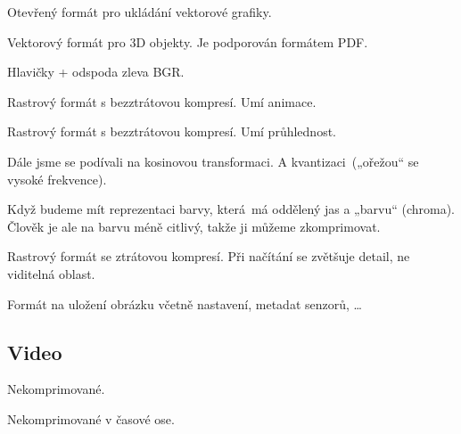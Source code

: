 \documentclass[12pt]{article}					%
\begin{document}
\begin{definice}[SVG]
	Otevřený formát pro ukládání vektorové grafiky.
\end{definice}

\begin{definice}[Universal 3D (U3D)]
	Vektorový formát pro 3D objekty. Je podporován formátem PDF.
\end{definice}

\begin{definice}
	Hlavičky + odspoda zleva BGR.
\end{definice}

\begin{definice}[GIF]
	Rastrový formát s bezztrátovou kompresí. Umí animace.
\end{definice}

\begin{definice}[PNG]
	Rastrový formát s bezztrátovou kompresí. Umí průhlednost.
\end{definice}

\begin{poznamka}
	Dále jsme se podívali na kosinovou transformaci. A kvantizaci („ořežou“ se vysoké frekvence).
\end{poznamka}

\begin{definice}
	Když budeme mít reprezentaci barvy, která má oddělený jas a „barvu“ (chroma). Člověk je ale na barvu méně citlivý, takže ji můžeme zkomprimovat.
\end{definice}

\begin{definice}[JPEG]
	Rastrový formát se ztrátovou kompresí. Při načítání se zvětšuje detail, ne viditelná oblast.
\end{definice}

\begin{definice}[RAW]
	Formát na uložení obrázku včetně nastavení, metadat senzorů, …
\end{definice}

\subsection{Video}
\begin{definice}[R210]
	Nekomprimované.
\end{definice}

\begin{definice}
	Nekomprimované v časové ose.
\end{definice}
\end{document}
